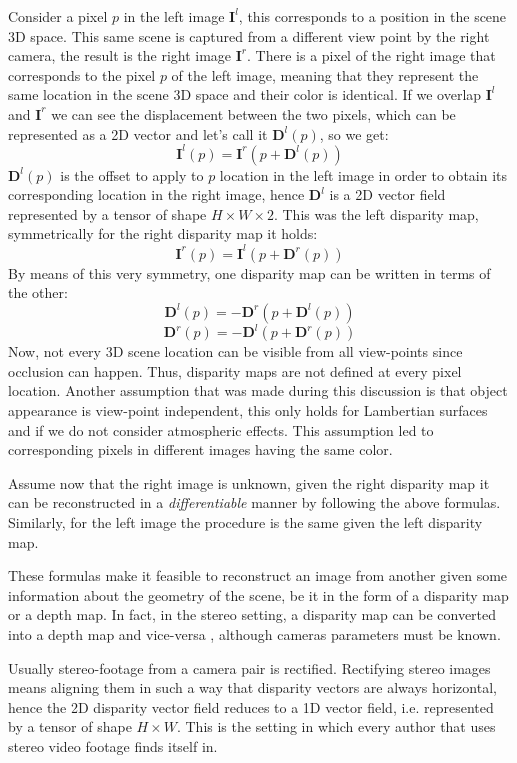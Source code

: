 Consider a pixel $p$ in the left image $\mathbf{I}^{l}$, this corresponds to a position in the scene 3D space.
This same scene is captured from a different view point by the right camera, the result is the right image $\mathbf{I}^{r}$.
There is a pixel of the right image that corresponds to the pixel $p$ of the left image, meaning that they represent the same location in the scene 3D space and their color is identical.
If we overlap $\mathbf{I}^{l}$ and $\mathbf{I}^{r}$ we can see the displacement between the two pixels, which can be represented as a 2D vector and let's call it $\mathbf{D}^{l}(p)$, so we get:
\[
	\mathbf{I}^{l}(p) = \mathbf{I}^{r}(p + \mathbf{D}^{l}(p))
\]
$\mathbf{D}^{l}(p)$ is the offset to apply to $p$ location in the left image in order to obtain its corresponding location in the right image, hence $\mathbf{D}^{l}$ is a 2D vector field represented by a tensor of shape $H \times W \times 2$.
This was the left disparity map, symmetrically for the right disparity map it holds:
\[
	\mathbf{I}^{r}(p) = \mathbf{I}^{l}(p + \mathbf{D}^{r}(p))
\]
By means of this very symmetry, one disparity map can be written in terms of the other:
\[
\mathbf{D}^{l}(p) = - \mathbf{D}^{r}(p + \mathbf{D}^{l}(p))
\]\[
\mathbf{D}^{r}(p) = - \mathbf{D}^{l}(p + \mathbf{D}^{r}(p))
\]
Now, not every 3D scene location can be visible from all view-points since occlusion can happen.
Thus, disparity maps are not defined at every pixel location.
Another assumption that was made during this discussion is that object appearance is view-point independent, this only holds for Lambertian surfaces and if we do not consider atmospheric effects.
This assumption led to corresponding pixels in different images having the same color.

Assume now that the right image is unknown, given the right disparity map it can be reconstructed in a \textit{differentiable} manner by following the above formulas.
Similarly, for the left image the procedure is the same given the left disparity map.

These formulas make it feasible to reconstruct an image from another given some information about the geometry of the scene, be it in the form of a disparity map or a depth map.
In fact, in the stereo setting, a disparity map can be converted into a depth map and vice-versa \cite{multiview}, although cameras parameters must be known.

Usually stereo-footage from a camera pair is rectified.
Rectifying stereo images means aligning them in such a way that disparity vectors are always horizontal, hence the 2D disparity vector field reduces to a 1D vector field, i.e. represented by a tensor of shape $H \times W$.
This is the setting in which every author that uses stereo video footage finds itself in.

